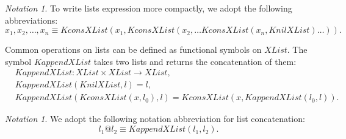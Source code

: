 \documentclass[UTF8,11pt]{article}
\makeatletter
\newcounter{thmcounter}
\theoremstyle{plain}
\theoremstyle{definition}
\theoremstyle{remark}
\newtheorem{notation}[thmcounter]{Notation}
\newcommand{\XList}{\mathit{XList}}
\newcommand{\KnilXList}{\mathit{KnilXList}}
\newcommand{\KconsXList}{\mathit{KconsXList}}
\newcommand{\KappendXList}{\mathit{KappendXList}}
\newcommand{\at}{@}
\makeatother
\begin{document}
\begin{notation}
	To write lists expression more compactly, we adopt the following abbreviations:
	\begin{equation*}
	  x_1, x_2, \dots, x_n \equiv \KconsXList(x_1, \KconsXList(x_2, \dots\KconsXList(x_n, \KnilXList)\dots)).
	\end{equation*}
\end{notation}

Common operations on lists can be defined as functional symbols on $\XList$.
The symbol $\KappendXList$ takes two lists and returns the concatenation of them:
\begin{align*}
  & \KappendXList \colon \XList \times \XList \to \XList,
  \\
  & \KappendXList(\KnilXList, l) = l,
  \\
  & \KappendXList(\KconsXList(x, l_0), l) = \KconsXList(x, \KappendXList(l_0, l)).
\end{align*}
\begin{notation}
	We adopt the following notation abbreviation for list concatenation:
	\begin{equation*}
	  l_1 \at l_2 \equiv \KappendXList(l_1, l_2).
	\end{equation*}
\end{notation}
\end{document}
